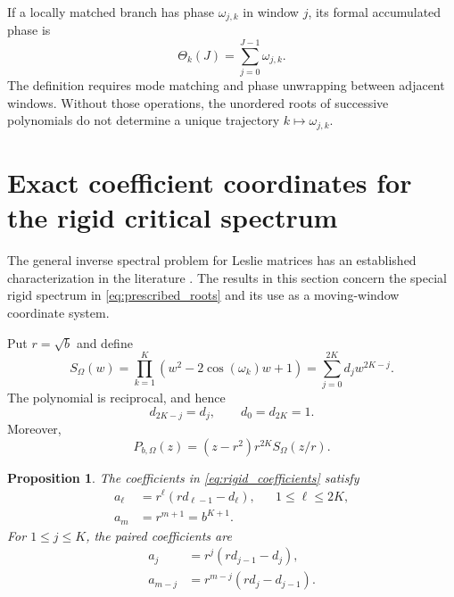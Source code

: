 \documentclass[11pt]{amsart}
\numberwithin{equation}{section}
\theoremstyle{plain}
\newtheorem{proposition}[theorem]{Proposition}
\theoremstyle{definition}
\theoremstyle{remark}
\begin{document}
If a locally matched branch has phase $\omega_{j,k}$ in window $j$, its formal accumulated phase is
\begin{equation}
\Theta_k(J)=\sum_{j=0}^{J-1}\omega_{j,k}.
\label{eq:accumulated_phase}
\end{equation}
The definition requires mode matching and phase unwrapping between adjacent windows.  Without those operations, the unordered roots of successive polynomials do not determine a unique trajectory $k\mapsto\omega_{j,k}$.

\section{Exact coefficient coordinates for the rigid critical spectrum}
\label{sec:eta_coordinates}

The general inverse spectral problem for Leslie matrices has an established characterization in the literature \cite{Benvenuti2019}.  The results in this section concern the special rigid spectrum in \eqref{eq:prescribed_roots} and its use as a moving-window coordinate system.

Put $r=\sqrt b$ and define
\begin{equation}
S_\Omega(w)
=\prod_{k=1}^{K}\left(w^2-2\cos(\omega_k)w+1\right)
=\sum_{j=0}^{2K}d_jw^{2K-j}.
\label{eq:unit_circle_factor}
\end{equation}
The polynomial is reciprocal, and hence
\begin{equation}
d_{2K-j}=d_j,
\qquad
d_0=d_{2K}=1.
\label{eq:palindromic_d}
\end{equation}
Moreover,
\begin{equation}
P_{b,\Omega}(z)
=(z-r^2)r^{2K}S_\Omega(z/r).
\label{eq:scaled_rigid_polynomial}
\end{equation}

\begin{proposition}
\label{prop:coefficient_formula}
The coefficients in \eqref{eq:rigid_coefficients} satisfy
\begin{align}
a_\ell
&=r^\ell\left(rd_{\ell-1}-d_\ell\right),
&&1\leq\ell\leq2K,
\label{eq:coefficient_formula_main}\\
a_m&=r^{m+1}=b^{K+1}.
\label{eq:last_coefficient_fixed}
\end{align}
For $1\leq j\leq K$, the paired coefficients are
\begin{align}
a_j
&=r^j\left(rd_{j-1}-d_j\right),
\label{eq:left_paired_coefficient}\\
a_{m-j}
&=r^{m-j}\left(rd_j-d_{j-1}\right).
\label{eq:right_paired_coefficient}
\end{align}
\end{proposition}
\end{document}
